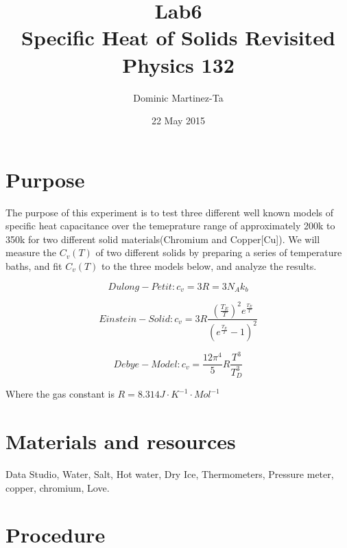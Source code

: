 \documentclass[12pt]{report}
\begin{document}
\title{Lab6 \\ Specific Heat of Solids Revisited \\ Physics 132}
\author{Dominic Martinez-Ta}
\date{22 May 2015}
\maketitle


\section{Purpose}
	
	The purpose of this experiment is to test three different well known models of specific heat capacitance over 
the temeprature range of approximately 200k to 350k  for two different solid materials(Chromium and Copper[Cu]).
 We will measure the $C_v(T)$ of two different solids by preparing a series of temperature baths, and fit $C_v(T)$
 to the three models below, and analyze the results.

\begin{equation}
Dulong-Petit: c_v = 3R = 3N_Ak_b
\end{equation}

\begin{equation}
Einstein-Solid: c_v = 3R\frac{(\frac{T_E}{T})^2e^{\frac{T_E}{T}}}{(e^{\frac{T_E}{T}}-1)^2}
\end{equation}

\begin{equation}
Debye-Model: c_v = \frac{12\pi^4}{5}R\frac{T^3}{T_D^3}
\end{equation}

Where the gas constant is $R = 8.314 J\cdot K^{-1}\cdot  Mol^{-1}$

\section {Materials and resources}

Data Studio, Water, Salt, Hot water, Dry Ice, Thermometers, Pressure meter, copper, chromium, Love.

\section{Procedure}
\end{document}
